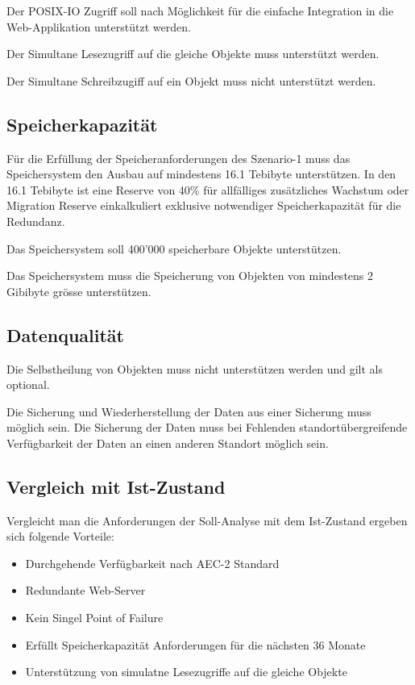Der \gls{POSIX-IO} Zugriff soll nach Möglichkeit für die einfache Integration in die Web-Applikation unterstützt werden.

Der Simultane Lesezugriff auf die gleiche Objekte muss unterstützt werden.

Der Simultane Schreibzugiff auf ein Objekt muss nicht unterstützt werden.

\subsection{Speicherkapazität}
Für die Erfüllung der Speicheranforderungen des Szenario-1 muss das Speichersystem den Ausbau auf mindestens 16.1 Tebibyte unterstützen. In den 16.1 Tebibyte ist eine Reserve von 40\% für allfälliges zusätzliches Wachstum oder Migration Reserve einkalkuliert exklusive notwendiger Speicherkapazität für die Redundanz.

Das Speichersystem soll 400'000 speicherbare Objekte unterstützen.

Das Speichersystem muss die Speicherung von Objekten von mindestens 2 Gibibyte grösse unterstützen.

\subsection{Datenqualität}

Die Selbstheilung von Objekten muss nicht unterstützen werden und gilt als optional.

Die Sicherung und Wiederherstellung der Daten aus einer Sicherung muss möglich sein. Die Sicherung der Daten muss bei Fehlenden standortübergreifende Verfügbarkeit der Daten an einen anderen Standort möglich sein.

\subsection{Vergleich mit Ist-Zustand}
Vergleicht man die Anforderungen der Soll-Analyse mit dem Ist-Zustand ergeben sich folgende Vorteile:

\begin{itemize}
\item Durchgehende Verfügbarkeit nach AEC-2 Standard
\item Redundante Web-Server
\item Kein Singel Point of Failure
\item Erfüllt Speicherkapazität Anforderungen für die nächsten 36 Monate
\item Unterstützung von simulatne Lesezugriffe auf die gleiche Objekte
\end{itemize}

